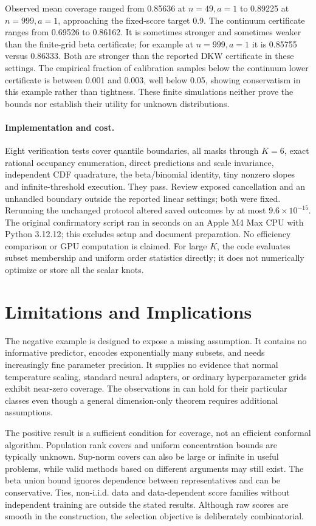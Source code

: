 \documentclass{article}
\begin{document}
Observed mean coverage ranged from 0.85636 at $n=49,a=1$ to 0.89225 at $n=999,a=1$, approaching the fixed-score target 0.9. The continuum certificate ranges from 0.69526 to 0.86162. It is sometimes stronger and sometimes weaker than the finite-grid beta certificate; for example at $n=999,a=1$ it is 0.85755 versus 0.86333. Both are stronger than the reported DKW certificate in these settings. The empirical fraction of calibration samples below the continuum lower certificate is between 0.001 and 0.003, well below 0.05, showing conservatism in this example rather than tightness. These finite simulations neither prove the bounds nor establish their utility for unknown distributions.

\paragraph{Implementation and cost.}
Eight verification tests cover quantile boundaries, all masks through $K=6$, exact rational occupancy enumeration, direct predictions and scale invariance, independent CDF quadrature, the beta/binomial identity, tiny nonzero slopes and infinite-threshold execution. They pass. Review exposed cancellation and an unhandled boundary outside the reported linear settings; both were fixed. Rerunning the unchanged protocol altered saved outcomes by at most $9.6\times10^{-15}$. The original confirmatory script ran in \RunSeconds{} seconds on an Apple M4 Max CPU with Python 3.12.12; this excludes setup and document preparation. No efficiency comparison or GPU computation is claimed. For large $K$, the code evaluates subset membership and uniform order statistics directly; it does not numerically optimize or store all the scalar knots.

\section{Limitations and Implications}

The negative example is designed to expose a missing assumption. It contains no informative predictor, encodes exponentially many subsets, and needs increasingly fine parameter precision. It supplies no evidence that normal temperature scaling, standard neural adapters, or ordinary hyperparameter grids exhibit near-zero coverage. The observations in \citet{zeng2025} can hold for their particular classes even though a general dimension-only theorem requires additional assumptions.

The positive result is a sufficient condition for coverage, not an efficient conformal algorithm. Population rank covers and uniform concentration bounds are typically unknown. Sup-norm covers can also be large or infinite in useful problems, while valid methods based on different arguments may still exist. The beta union bound ignores dependence between representatives and can be conservative. Ties, non-i.i.d. data and data-dependent score families without independent training are outside the stated results. Although raw scores are smooth in the construction, the selection objective is deliberately combinatorial.
\end{document}
